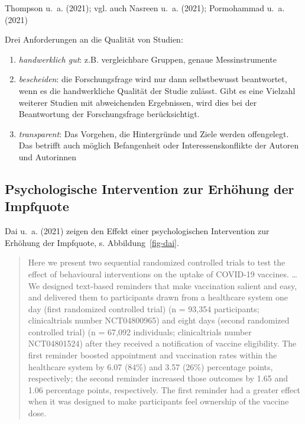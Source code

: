\documentclass[
  a4paper,
  DIV=11]{scrreprt}
\providecommand{\tightlist}{%
  \setlength{\itemsep}{0pt}\setlength{\parskip}{0pt}}\usepackage{longtable,booktabs,array}
\theoremstyle{definition}
\theoremstyle{remark}
\begin{document}
Thompson u.~a. (2021); vgl. auch Nasreen u.~a. (2021); Pormohammad u.~a.
(2021)

Drei Anforderungen an die Qualität von Studien:

\begin{enumerate}
\def\labelenumi{\arabic{enumi}.}
\tightlist
\item
  \emph{handwerklich gut}: z.B. vergleichbare Gruppen, genaue
  Messinstrumente
\item
  \emph{bescheiden}: die Forschungsfrage wird nur dann selbstbewusst
  beantwortet, wenn es die handwerkliche Qualität der Studie zulässt.
  Gibt es eine Vielzahl weiterer Studien mit abweichenden Ergebnissen,
  wird dies bei der Beantwortung der Forschungsfrage berücksichtigt.
\item
  \emph{transparent}: Das Vorgehen, die Hintergründe und Ziele werden
  offengelegt. Das betrifft auch möglich Befangenheit oder
  Interessenskonflikte der Autoren und Autorinnen
\end{enumerate}

\hypertarget{psychologische-intervention-zur-erhuxf6hung-der-impfquote}{%
\subsection{Psychologische Intervention zur Erhöhung der
Impfquote}\label{psychologische-intervention-zur-erhuxf6hung-der-impfquote}}

Dai u.~a. (2021) zeigen den Effekt einer psychologischen Intervention
zur Erhöhung der Impfquote, s. Abbildung~\ref{fig-dai}.

\begin{quote}
Here we present two sequential randomized controlled trials to test the
effect of behavioural interventions on the uptake of COVID-19 vaccines.
\ldots{} We designed text-based reminders that make vaccination salient
and easy, and delivered them to participants drawn from a healthcare
system one day (first randomized controlled trial) (n = 93,354
participants; clinicaltrials number NCT04800965) and eight days (second
randomized controlled trial) (n = 67,092 individuals; clinicaltrials
number NCT04801524) after they received a notification of vaccine
eligibility. The first reminder boosted appointment and vaccination
rates within the healthcare system by 6.07 (84\%) and 3.57 (26\%)
percentage points, respectively; the second reminder increased those
outcomes by 1.65 and 1.06 percentage points, respectively. The first
reminder had a greater effect when it was designed to make participants
feel ownership of the vaccine dose.
\end{quote}
\end{document}
